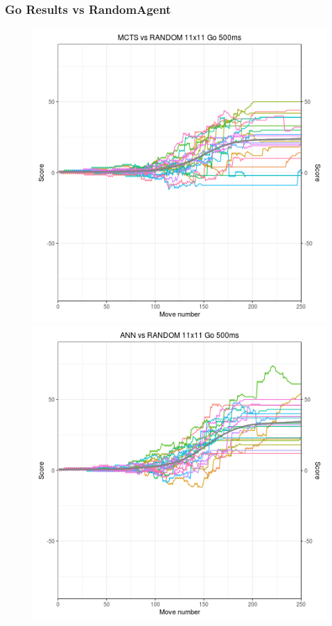 \documentclass{beamer}
\begin{document}
\begin{frame}
\frametitle{Go Results vs RandomAgent}
\begin{figure}[h]
\centering
\begin{minipage}{.45\textwidth}
  \centering
  \includegraphics[scale=0.3]{images/mctsrand500go11.png}
\end{minipage}%
\begin{minipage}{.45\textwidth}
  \centering
  \includegraphics[scale=0.3]{images/annrand500go11.png}
\end{minipage}
\label{fig:rand}
\end{figure}
\end{frame}
\end{document}
